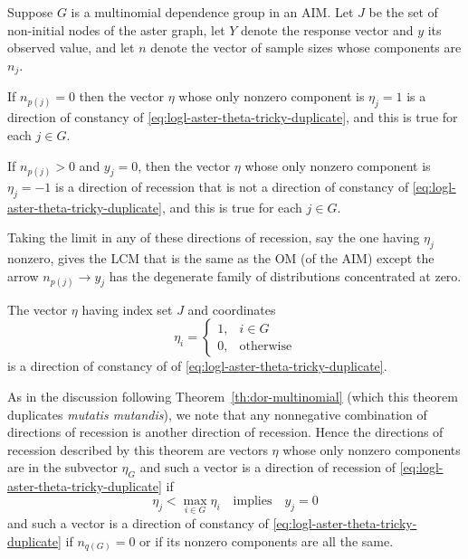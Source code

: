 \begin{theorem} \label{th:dor-aim-multinomial}
Suppose $G$ is a multinomial dependence group in an AIM.
Let $J$ be the set of non-initial nodes of the aster graph,
let $Y$ denote the response vector and $y$ its observed value,
and let $n$ denote the vector of sample sizes whose components are $n_j$.

If $n_{p(j)} = 0$ then the vector $\eta$ whose only nonzero component
is $\eta_j = 1$ is a direction of constancy
of \eqref{eq:logl-aster-theta-tricky-duplicate},
and this is true for each $j \in G$.

If $n_{p(j)} > 0$ and $y_j = 0$,
then the vector $\eta$ whose only nonzero component
is $\eta_j = -1$ is a direction of recession
that is not a direction of constancy
of \eqref{eq:logl-aster-theta-tricky-duplicate},
and this is true for each $j \in G$.

Taking the limit in any of these directions of recession,
say the one having $\eta_j$ nonzero,
gives the LCM that is the same as the OM (of the AIM) except the arrow
$n_{p(j)} \longrightarrow y_j$ has
the degenerate family of distributions
concentrated at zero.

The vector $\eta$ having index set $J$ and coordinates
\begin{equation} \label{eq:doc-aim-multinomial}
   \eta_i = \begin{cases} 1, & i \in G \\
   0, & \text{otherwise} \end{cases}
\end{equation}
is a direction of constancy of
of \eqref{eq:logl-aster-theta-tricky-duplicate}.
\end{theorem}

As in the discussion following Theorem~\ref{th:dor-multinomial}
(which this theorem duplicates \emph{mutatis mutandis}),
we note that any nonnegative combination of directions of recession is
another direction of recession.  Hence the directions of recession
described by this theorem are vectors $\eta$ whose only nonzero components
are in the subvector $\eta_G$ and such a vector is a direction of recession
of \eqref{eq:logl-aster-theta-tricky-duplicate} if
$$
   \eta_j < \max_{i \in G} \eta_i \quad \text{implies} \quad y_j = 0
$$
and such a vector is a direction of constancy
of \eqref{eq:logl-aster-theta-tricky-duplicate} if $n_{q(G)} = 0$ or if
its nonzero components are all the same.

